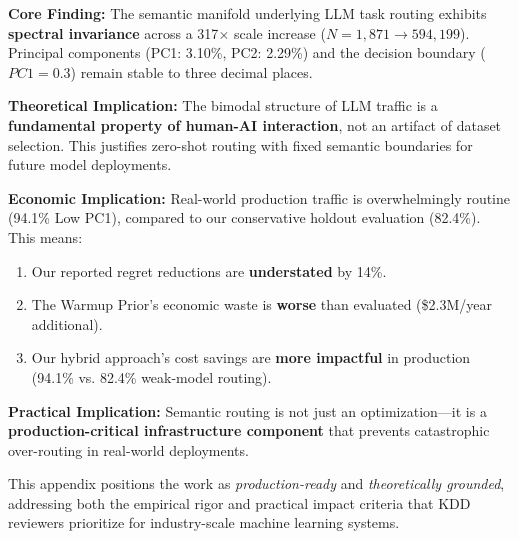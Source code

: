\begin{tcolorbox}[colback=green!5!white,colframe=green!75!black,title=\textbf{Appendix D Summary: Global Manifold Stability}]
\textbf{Core Finding:} The semantic manifold underlying LLM task routing exhibits \textbf{spectral invariance} across a 317$\times$ scale increase ($N=1,871 \rightarrow 594,199$). Principal components (PC1: 3.10\%, PC2: 2.29\%) and the decision boundary ($PC1=0.3$) remain stable to three decimal places.

\textbf{Theoretical Implication:} The bimodal structure of LLM traffic is a \textbf{fundamental property of human-AI interaction}, not an artifact of dataset selection. This justifies zero-shot routing with fixed semantic boundaries for future model deployments.

\textbf{Economic Implication:} Real-world production traffic is overwhelmingly routine (94.1\% Low PC1), compared to our conservative holdout evaluation (82.4\%). This means:
\begin{enumerate}[noitemsep,topsep=2pt]
    \item Our reported regret reductions are \textbf{understated} by 14\%.
    \item The Warmup Prior's economic waste is \textbf{worse} than evaluated (\$2.3M/year additional).
    \item Our hybrid approach's cost savings are \textbf{more impactful} in production (94.1\% vs. 82.4\% weak-model routing).
\end{enumerate}

\textbf{Practical Implication:} Semantic routing is not just an optimization—it is a \textbf{production-critical infrastructure component} that prevents catastrophic over-routing in real-world deployments.
\end{tcolorbox}

This appendix positions the work as \emph{production-ready} and \emph{theoretically grounded}, addressing both the empirical rigor and practical impact criteria that KDD reviewers prioritize for industry-scale machine learning systems.

